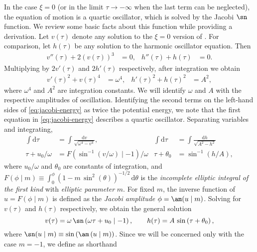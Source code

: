 In the case $\xi=0$ (or in the limit $\tau\to-\infty$ when the last term can be neglected), the equation of motion  is a quartic oscillator, which is solved by the Jacobi \texorpdfstring{$\sn$}{sn} function. We review some basic facts about this function while providing a derivation. Let $v(\tau)$ denote any solution to the $\xi=0$ version of . For comparison, let $h(\tau)$ be any solution to the harmonic oscillator equation. Then 
\begin{align}
v''(\tau)+2\left(v(\tau)\right)^{3} & =0, & h''(\tau)+h(\tau) & =0.\label{eq:jacobi-eom}
\end{align}
 Multiplying  by $2v'(\tau)$ and $2h'(\tau)$ respectively, after integration we obtain 
\begin{align}
v'(\tau)^{2}+v(\tau)^{4} & =\omega^{4}, & h'(\tau)^{2}+h(\tau)^{2} & =A^{2},\label{eq:jacobi-energy}
\end{align}
 where $\omega^{4}$ and $A^{2}$ are integration constants. We will identify $\omega$ and $A$ with the respective amplitudes of oscillation. Identifying the second terms on the left-hand sides of \eqref{eq:jacobi-energy} as twice the potential energy, we note that the first equation in \eqref{eq:jacobi-energy} describes a quartic oscillator. Separating variables and integrating, 
\begin{align}
\int\mathrm{d}\tau & =\int\frac{\mathrm{d}v}{\sqrt{\omega^{4}-v^{4}}}, & \int\mathrm{d}\tau & =\int\frac{\mathrm{d}h}{\sqrt{A^{2}-h^{2}}}\nonumber \\
\tau+u_{0}/\omega & =F\left(\sin^{-1}\left(v/\omega\right)\mid-1\right)/\omega & \tau+\theta_{0} & =\sin^{-1}\left(h/A\right),\label{eq:elliptic-F}
\end{align}
 where $u_{0}/\omega$ and $\theta_{0}$ are constants of integration, and $F(\phi\mid m)\equiv\int_{0}^{\phi}\left(1-m\,\sin^{2}(\theta)\right)^{-1/2}\,\mathrm{d}\theta$ is the \emph{incomplete elliptic integral of the first kind} with \emph{elliptic parameter} $m$. For fixed $m$, the inverse function of $u=F(\phi\mid m)$ is defined as the \emph{Jacobi amplitude} $\phi=\am(u\mid m)$. Solving for $v(\tau)$ and $h(\tau)$ respectively, we obtain the general solution 
\begin{equation}
v(\tau)=\omega\,\sn\left(\omega\tau+u_{0}\mid-1\right),\qquad h(\tau)=A\,\sin\left(\tau+\theta_{0}\right),\label{eq:quartic-solution}
\end{equation}
 where $\sn(u\mid m)\equiv\sin\left(\am\left(u\mid m\right)\right)$. Since we will be concerned only with the case $m=-1$, we define as shorthand
